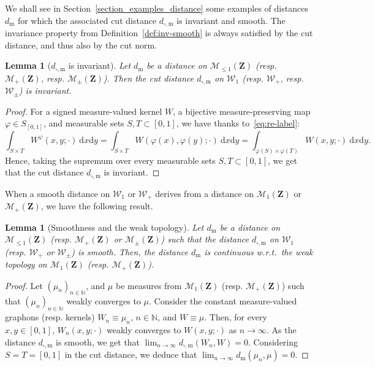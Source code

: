 \documentclass{amsart}
\newcommand{\wrt}{w.r.t.\ }
\theoremstyle{plain}
\newtheorem{lemme}[Th]{Lemma}
\newtheorem{lem}[Th]{Lemma}
\theoremstyle{definition}
\newcommand{\Space}{\mathbf{Z}}
\newcommand{\signed}{\pm}
\newcommand{\Proba}{\mathcal{M}_1(\Space)}
\newcommand{\SubProba}{\mathcal{M}_{\leq1}(\Space)}
\newcommand{\Meas}{\mathcal{M}_+(\Space)}
\newcommand{\SignedMeas}{\mathcal{M}_{\pm}(\Space)}
\newcommand{\Graphon}{\mathcal{W}_1}
\newcommand{\Kernel}{\mathcal{W}_{\signed}}
\newcommand{\Kernelp}{\mathcal{W}_{+}}
\newcommand{\InvRelabel}{S_{[0,1]}}
\newcommand{\m}{\mathrm{m}}
\newcommand{\dmeas}{d_\m}
\newcommand{\dcut}{d_{\square,\m}}
\newcommand{\N}{\mathbb{N}}
\newcommand{\drv}{\mathrm{d}}
\begin{document}
We shall see in Section~\ref{section_examples_distance}
some examples of distances $\dmeas$
for which the associated cut distance $\dcut$ is invariant and smooth. 
The invariance  property from Definition~\ref{def:inv-smooth}  is always
satisfied by the cut distance, and thus also by the cut norm.

\begin{lemme}[$\dcut$ is invariant]\label{lemma_dcut_invariant}
Let $\dmeas$ be a distance on $\SubProba$ (resp.  $\Meas$, resp. $\SignedMeas$). 
Then the cut distance $\dcut$ on $\Graphon$ (resp. $\Kernelp$, resp. $\Kernel$) is invariant.
\end{lemme}

\begin{proof}
For a signed measure-valued kernel $W$, a
bijective measure-preserving map
$\varphi \in \InvRelabel$, 
and  measurable sets $S,T\subset [0,1]$, we have thanks to~\eqref{eq:re-label}:
\[ \int_{S\times T} W^\varphi(x,y;\cdot)\ \drv x \drv y
= \int_{S\times T} W(\varphi(x),\varphi(y);\cdot)\ \drv x \drv y
= \int_{\varphi(S)\times \varphi(T)} W(x,y;\cdot)\ \drv x \drv y
.
\]
Hence, taking the supremum over every measurable sets $S,T\subset [0,1]$,
we get that the cut distance $\dcut$ is invariant.
\end{proof}



When a smooth  distance on $\Graphon$ or  $\Kernelp$ derives from a distance on
$\Proba$ or $\Meas$, we have the following result. 

\begin{lem}[Smoothness and the weak topology]
  \label{lem:dm-smooth-d-cont}
  Let $\dmeas$ be a distance on $\SubProba$ (resp. $\Meas$ or $\SignedMeas$) such that the
  distance $\dcut$ on $\Graphon$ (resp. $\Kernelp$ or $\Kernel$) is smooth. Then, the
  distance $\dmeas$ is continuous \wrt the weak topology on
  $\Proba$ (resp. $\Meas$). 
\end{lem}

\begin{proof}
  Let  $(\mu_n)_{n\in\N}$,  and  $\mu$  be   measures  from  $\Proba$
  (resp. $\Meas$) such that $(\mu_n)_{n\in\N}$ weakly converges to
  $\mu$.  Consider the constant  measure-valued graphons (resp. kernels)
  $W_n  \equiv \mu_n$,  $n\in\N$, and  $W\equiv \mu$.   Then, for  every
  $x,y\in [0,1]$,  $W_n(x,y;\cdot)$ weakly converges  to $W(x,y;\cdot)$
  	as $n\to \infty$.
  As    the    distance    $\dcut$    is    smooth,    we    get    that
  $\lim_{n\rightarrow\infty } \dcut(W_n,W)= 0$.  Considering $S=T=[0,1]$
  in    the     cut    distance,     we    deduce that
  $\lim_{n\rightarrow\infty } \dmeas(\mu_n,\mu) = 0$.
\end{proof}
\end{document}
